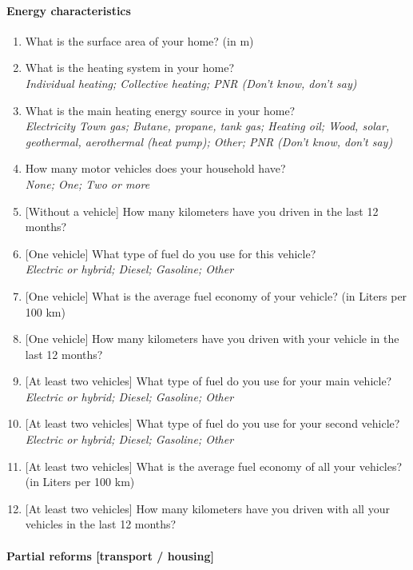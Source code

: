 \documentclass[english,5p,authoryear]{elsarticle}
\begin{document}
\begin{appendices}
\paragraph{Energy characteristics}
\begin{enumerate}[resume,leftmargin=*]
\item What is the surface area of your home? (in m\texttwosuperior )
\item What is the heating system in your home? \textit{}\\
\textit{Individual heating; Collective heating; PNR (Don't know, don't
say)}
\item What is the main heating energy source in your home? \textit{}\\
\textit{Electricity Town gas; Butane, propane, tank gas; Heating oil;
Wood, solar, geothermal, aerothermal (heat pump); Other; PNR (Don't
know, don't say)}
\item How many motor vehicles does your household have? \textit{}\\
\textit{None; One; Two or more} 
\item {[}Without a vehicle{]} How many kilometers have you driven in the
last 12 months? 
\item {[}One vehicle{]} What type of fuel do you use for this vehicle? \textit{}\\
\textit{Electric or hybrid; Diesel; Gasoline; Other} 
\item {[}One vehicle{]} What is the average fuel economy of your vehicle?
(in Liters per 100 km)
\item {[}One vehicle{]} How many kilometers have you driven with your vehicle
in the last 12 months?
\item {[}At least two vehicles{]} What type of fuel do you use for your
main vehicle?\\
 \textit{Electric or hybrid; Diesel; Gasoline; Other} 
\item {[}At least two vehicles{]} What type of fuel do you use for your
second vehicle?\\
 \textit{Electric or hybrid; Diesel; Gasoline; Other} 
\item {[}At least two vehicles{]} What is the average fuel economy of all
your vehicles? (in Liters per 100 km) 
\item {[}At least two vehicles{]} How many kilometers have you driven with
all your vehicles in the last 12 months? 
\end{enumerate}

\paragraph{Partial reforms {[}transport / housing{]}}


\end{appendices}
\end{document}
